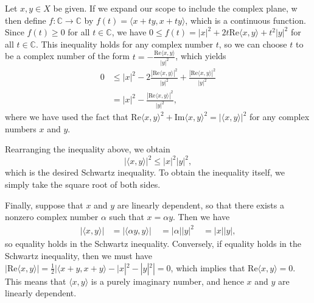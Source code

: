 \documentclass[12pt]{article}
\begin{document}
Let $x,y\in X$ be given. If we expand our scope to include the complex plane, w then define $f:\mathbb{C}\to\mathbb{C}$ by $f(t) = \langle x+ty, x+ty\rangle$, which is a continuous function. Since $f(t) \geq 0$ for all $t\in\mathbb{C}$, we have $0\leq f(t) = |x|^2 + 2t\mathrm{Re}\langle x,y\rangle + t^2|y|^2$ for all $t\in\mathbb{C}$. This inequality holds for any complex number $t$, so we can choose $t$ to be a complex number of the form $t=-\frac{\mathrm{Re}\langle x,y\rangle}{|y|^2}$, which yields
\begin{align*}
    0 &\leq |x|^2 - 2\frac{|\mathrm{Re}\langle x,y\rangle|^2}{|y|^2} + \frac{|\mathrm{Re}\langle x,y\rangle|^2}{|y|^2} \\
    &= |x|^2 - \frac{|\mathrm{Re}\langle x,y\rangle|^2}{|y|^2},
\end{align*}
where we have used the fact that $\mathrm{Re}\langle x,y\rangle^2 + \mathrm{Im}\langle x,y\rangle^2 = |\langle x,y\rangle|^2$ for any complex numbers $x$ and $y$.

Rearranging the inequality above, we obtain
\begin{equation*}
|\langle x,y\rangle|^2 \leq |x|^2|y|^2,
\end{equation*}
which is the desired Schwartz inequality. To obtain the inequality itself, we simply take the square root of both sides.

Finally, suppose that $x$ and $y$ are linearly dependent, so that there exists a nonzero complex number $\alpha$ such that $x=\alpha y$. Then we have
\begin{align*}
|\langle x,y\rangle| &= |\langle \alpha y, y\rangle|\
&= |\alpha| |y|^2\
&= |x||y|,
\end{align*}
so equality holds in the Schwartz inequality. Conversely, if equality holds in the Schwartz inequality, then we must have $|\mathrm{Re}\langle x,y\rangle| = \frac{1}{2}|\langle x+y,x+y\rangle - |x|^2 - |y|^2| = 0$, which implies that $\mathrm{Re}\langle x,y\rangle = 0$. This means that $\langle x,y\rangle$ is a purely imaginary number, and hence $x$ and $y$ are linearly dependent.
\end{document}
